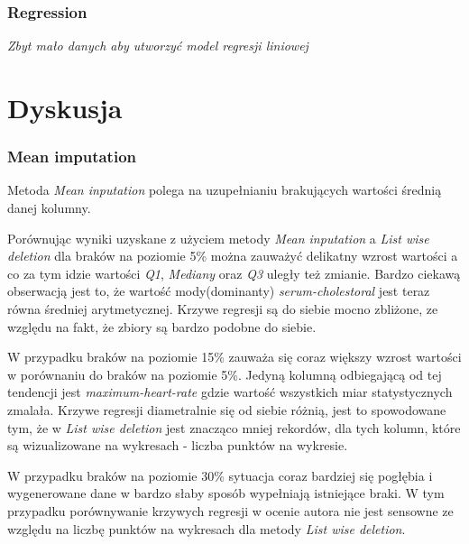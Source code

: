 \documentclass{classrep}
\begin{document}
{{{            }

            \subsubsection{Regression}
            \label{results:45-percent:regression} {
                \textit{Zbyt mało danych aby utworzyć model regresji liniowej}
            }
        }
    }

    \section{Dyskusja}
    \label{summary} {

        \subsubsection{Mean imputation}
        \label{summary:mean-input} {
            Metoda \textit{Mean inputation} polega na uzupełnianiu brakujących wartości średnią 
            danej kolumny.
        
            Porównując wyniki uzyskane z użyciem metody \textit{Mean inputation} a
            \textit{List wise deletion} dla braków na poziomie 5\% można zauważyć delikatny
            wzrost wartości a co za tym idzie wartości \textit{Q1}, \textit{Mediany} oraz \textit{Q3} uległy też zmianie.
            Bardzo ciekawą obserwacją jest to, że wartość mody(dominanty) \textit{serum-cholestoral} jest
            teraz równa średniej arytmetycznej. Krzywe regresji są do siebie mocno zbliżone,
            ze względu na fakt, że zbiory są bardzo podobne do siebie.
            
            W przypadku braków na poziomie 15\% zauważa się coraz większy wzrost wartości 
            w porównaniu do braków na poziomie 5\%. Jedyną kolumną odbiegającą od tej 
            tendencji jest \textit{maximum-heart-rate} gdzie wartość wszystkich miar 
            statystycznych zmalała. Krzywe regresji diametralnie się od siebie różnią, 
            jest to spowodowane tym, że w \textit{List wise deletion} jest znacząco 
            mniej rekordów, dla tych kolumn, które są wizualizowane na
            wykresach - liczba punktów na wykresie.
            
            W przypadku braków na poziomie 30\% sytuacja coraz bardziej się pogłębia 
            i wygenerowane dane w bardzo słaby sposób wypełniają istniejące braki. W tym 
            przypadku porównywanie krzywych regresji w ocenie autora nie jest sensowne ze
            względu na liczbę punktów na wykresach dla metody \textit{List wise deletion}.
            
}}
\end{document}
